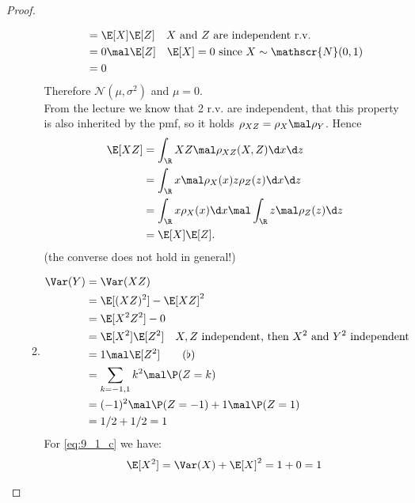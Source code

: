 \begin{proof}
\begin{enumerate}
\begin{enumerate}
\begin{align*}
				&= \E[X]\E[Z]\quad \text{$X$ and $Z$ are independent r.v.}\\
				&= 0\mal \E[Z] \quad \E[X] = 0 \text{ since } X \sim \mathscr{N}(0,1)\\
				&= 0 
			\end{align*}
			Therefore $\mathscr{N}(\mu,\sigma^2)$ and $\mu =0$.\\
			From the lecture we know that 2 r.v. are independent, that this property is also inherited by the pmf, so it holds $\rho_{XZ} = \rho_X \mal \rho_Y$. Hence
			\begin{align*}
				\E[XZ] &= \int_{\R} XZ \mal \rho_{XZ}(X,Z)\d x \d z\\
				&= \int_{\R} x\mal \rho_X(x)z\rho_Z(z) \d x \d z\\
				&= \int_{\R} x \rho_X(x)\d x \mal \int_{\R} z \mal \rho_Z (z) \d z\\
				&= \E[X] \E[Z].
			\end{align*}
			(the converse does not hold in general!)
			\item 
			\begin{align*}
				\Var(Y) &= \Var(XZ)\\
				&= \E[(XZ)^2]-\E[XZ]^2 \\
				&= \E[X^2 Z^2] - 0\\
				&= \E[X^2]\E[Z^2] \quad \text{$X,Z$ independent, then $X^2$ and $Y^2$ independent}\\
				&= 1 \mal \E[Z^2] \tag{$\flat$}\label{eq:9_1_c}\\
				&= \sum_{k = -1,1}k^2 \mal \P(Z = k)\\
				&= (-1)^2\mal \P(Z = -1) + 1\mal \P(Z=1)\\
				&= 1/2 + 1/2 = 1
			\end{align*}
			For \eqref{eq:9_1_c} we have:
			\begin{align*}
				\E[X^2] = \Var(X) + \E[X]^2 = 1+0 = 1
			\end{align*}
		\end{enumerate}
	\end{enumerate}
\end{proof}

